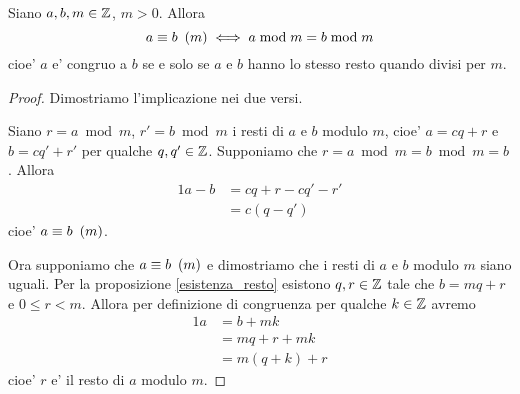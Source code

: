\begin{theorem} \label{equiv_congr_resto}
    Siano $a, b, m \in \mathbb{Z}$, $m > 0$. Allora
    \begin{equation}
        a \equiv b \ \left(m\right) \iff a \bmod m = b \bmod m
    \end{equation}
    cioe' $a$ e' congruo a $b$ se e solo se $a$ e $b$ hanno lo stesso resto quando divisi per $m$.
\end{theorem}
\begin{proof}
    Dimostriamo l'implicazione nei due versi.

    Siano $r = a \bmod m$, $r' = b \bmod m$ i resti di $a$ e $b$ modulo $m$, 
    cioe' $a = cq + r$ e $b = cq' + r'$ per qualche $q, q' \in \mathbb{Z}$. Supponiamo 
    che $r = a \bmod m = b \bmod m = b$. Allora
    \begin{alignat*}
        {1}
        a - b &= cq + r - cq' - r' \\
              &= c(q - q')
    \end{alignat*}
    cioe' $a \equiv b \ \left(m\right)$.

    Ora supponiamo che $a \equiv b \ \left(m\right)$ e dimostriamo che i resti di $a$ e $b$ modulo $m$ siano uguali.
    Per la proposizione \ref{esistenza_resto} esistono $q, r \in \mathbb{Z}$ tale che $b = mq + r$ e $0 \leq r < m$.
    Allora per definizione di congruenza per qualche $k \in \mathbb{Z}$ avremo
    \begin{alignat*}
        {1}
        a &= b + mk \\
          &= mq + r + mk \\
          &= m(q + k) + r
    \end{alignat*}
    cioe' $r$ e' il resto di $a$ modulo $m$.
\end{proof}

